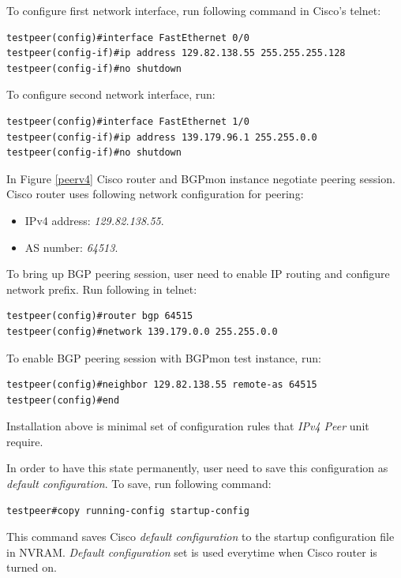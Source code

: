 To configure first network interface, run following command in Cisco's telnet:
\begin{verbatim}
testpeer(config)#interface FastEthernet 0/0 
testpeer(config-if)#ip address 129.82.138.55 255.255.255.128
testpeer(config-if)#no shutdown
\end{verbatim}

To configure second network interface, run:
\begin{verbatim}
testpeer(config)#interface FastEthernet 1/0 
testpeer(config-if)#ip address 139.179.96.1 255.255.0.0
testpeer(config-if)#no shutdown
\end{verbatim}

In Figure \ref{peerv4} Cisco router and BGPmon instance negotiate peering session.  Cisco router uses following network configuration for peering: 
\begin{itemize}
  \item{IPv4 address: \emph{129.82.138.55}.}
  \item{AS number: \emph{64513}.}
\end{itemize}

To bring up BGP peering session, user need to enable IP routing and configure network prefix. Run following in telnet:

\begin{verbatim}
testpeer(config)#router bgp 64515
testpeer(config)#network 139.179.0.0 255.255.0.0
\end{verbatim}

To enable BGP peering session with BGPmon test instance, run:

\begin{verbatim}
testpeer(config)#neighbor 129.82.138.55 remote-as 64515 
testpeer(config)#end
\end{verbatim}

Installation above is  minimal set of configuration rules that \emph{IPv4 Peer} unit require.

In order to have this state permanently,  user need to save this configuration as  \emph{default configuration}.  To save, run following command:

\begin{verbatim}
testpeer#copy running-config startup-config
\end{verbatim}

This command saves Cisco \emph{default configuration} to the startup configuration file in NVRAM. \emph{Default configuration} set is used everytime when Cisco router is turned on.


